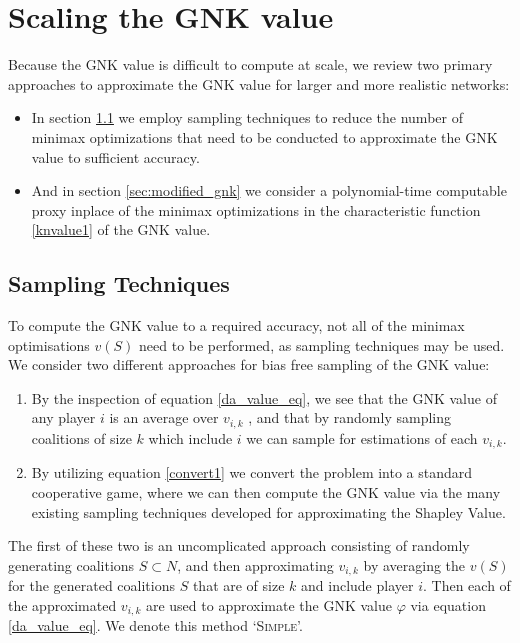 \section{Scaling the GNK value}\label{sec:scaling}

Because the GNK value is difficult to compute at scale, we review two primary approaches to approximate the GNK value for larger and more realistic networks:

\begin{itemize}
    \item In section \ref{sec:sampling_techniques} we employ sampling techniques to reduce the number of minimax optimizations that need to be conducted to approximate the GNK value to sufficient accuracy.
    \item And in section \ref{sec:modified_gnk} we consider a polynomial-time computable proxy inplace of the minimax optimizations in the characteristic function \eqref{knvalue1} of the GNK value.
\end{itemize}

\subsection{Sampling Techniques}\label{sec:sampling_techniques}
To compute the GNK value to a required accuracy, not all of the minimax optimisations $v(S)$ need to be performed, as sampling techniques may be used.
We consider two different approaches for bias free sampling of the GNK value:
\begin{enumerate}
    \item By the inspection of equation \ref{da_value_eq}, we see that the GNK value of any player $i$ is an average over $v_{i,k}$%
, and that by randomly sampling coalitions of size $k$ which include $i$ we can sample for estimations of each $v_{i,k}$.
    \item By utilizing equation \ref{convert1} we convert the problem into a standard cooperative game, where we can then compute the GNK value via the many existing sampling techniques developed for approximating the Shapley Value.
\end{enumerate}

The first of these two is an uncomplicated approach consisting of randomly generating coalitions $S\subset N$, %
and then approximating $v_{i,k}$ by averaging the $v(S)$ for the generated coalitions $S$ that are of size $k$ and include player $i$.
Then each of the approximated $v_{i,k}$ are used to approximate the GNK value $\varphi$ via equation \ref{da_value_eq}. We denote this method `\textsc{Simple}'.


